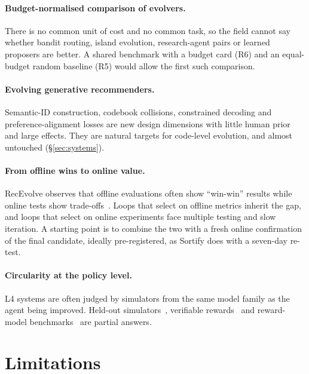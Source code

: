 \documentclass[sigconf,nonacm]{acmart}
\begin{document}
\paragraph{Budget-normalised comparison of evolvers.} There is no common unit of cost and no common task, so the field
cannot say whether bandit routing, island evolution, research-agent pairs or learned proposers are better. A shared
benchmark with a budget card (R6) and an equal-budget random baseline (R5) would allow the first such comparison.

\paragraph{Evolving generative recommenders.} Semantic-ID construction, codebook collisions, constrained decoding and
preference-alignment losses are new design dimensions with little human prior and large effects. They are natural
targets for code-level evolution, and almost untouched (\S\ref{sec:systems}).

\paragraph{From offline wins to online value.} RecEvolve observes that offline evaluations often show ``win-win''
results while online tests show trade-offs~\cite{pan2026recevolve}. Loops that select on offline metrics inherit the
gap, and loops that select on online experiments face multiple testing and slow iteration. A starting point is to combine the two with a fresh
online confirmation of the final candidate, ideally pre-registered, as Sortify does with a seven-day re-test.

\paragraph{Circularity at the policy level.} L4 systems are often judged by simulators from the same model family as the
agent being improved. Held-out simulators~\cite{kim2026selfevolverec}, verifiable rewards~\cite{narasimhan2026taurec}
and reward-model benchmarks~\cite{zeng2026recrmbench} are partial answers.

\section{Limitations}\label{sec:threats}
\end{document}
